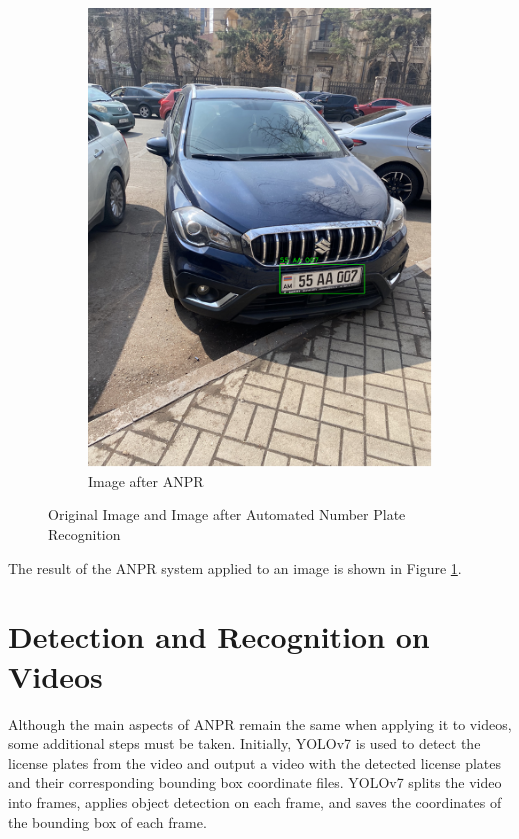 \documentclass[conference]{IEEEtran}
\begin{document}
\begin{figure}[ht]
\begin{subfigure}[b]{0.45\linewidth}
    \includegraphics[width=\linewidth]{images/Picture31.png}
    \caption{Image after ANPR}
  \end{subfigure}
  \caption{Original Image and Image after Automated Number Plate Recognition}
  \label{fig:combined9}
\end{figure}

The result of the ANPR system applied to an image is shown in Figure \ref{fig:combined9}. 

\section{Detection and Recognition on Videos}

Although the main aspects of ANPR remain the same when applying it to videos, some additional steps must be taken. Initially, YOLOv7 is used to detect the license plates from the video and output a video with the detected license plates and their corresponding bounding box coordinate files. YOLOv7 splits the video into frames, applies object detection on each frame, and saves the coordinates of the bounding box of each frame.  
\end{document}
